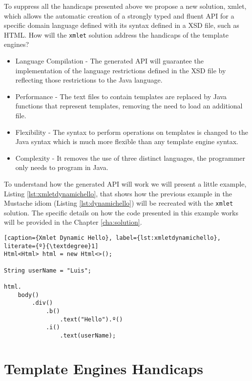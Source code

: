 \noindent
To suppress all the handicaps presented above we propose a new solution, xmlet, which allows the automatic creation of a strongly typed and fluent \ac{API} for a specific domain language defined with its syntax defined in a \ac{XSD} file, such as \ac{HTML}. How will the \texttt{xmlet} solution address the handicaps of the template engines?

\begin{itemize}
	\item Language Compilation - The generated \ac{API} will guarantee the implementation of the language restrictions defined in the \ac{XSD} file by reflecting those restrictions to the Java language.
	\item Performance - The text files to contain templates are replaced by Java functions that represent templates, removing the need to load an additional file.
	\item Flexibility - The syntax to perform operations on templates is changed to the Java syntax which is much more flexible than any template engine syntax.
	\item Complexity - It removes the use of three distinct languages, the programmer only needs to program in Java.
\end{itemize}

\noindent
To understand how the generated \ac{API} will work we will present a little example, Listing \ref{lst:xmletdynamichello}, that shows how the previous example in the Mustache idiom (Listing \ref{lst:dynamichello}) will be recreated with the \texttt{xmlet} solution. The specific details on how the code presented in this example works will be provided in the Chapter \ref{cha:solution}.


\bigskip

\begin{minipage}{\linewidth}
\begin{lstlisting}[caption={Xmlet Dynamic Hello}, label={lst:xmletdynamichello}, literate={º}{\textdegree}1]
Html<Html> html = new Html<>();

String userName = "Luis";

html.
    body()
        .div()
            .b()
                .text("Hello").º()
            .i()
                .text(userName);
\end{lstlisting}
\end{minipage} 

\section{Template Engines Handicaps}
\label{sec:usecase}

